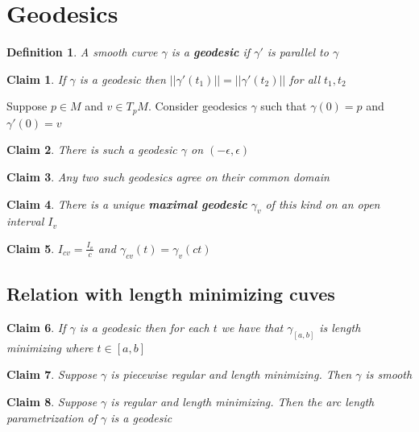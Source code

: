 \documentclass{article}
\newtheorem{definition}{Definition}
\newtheorem{claim}{Claim}
\begin{document}
\section{Geodesics}

\begin{definition}
    A smooth curve $\gamma$ is a \textbf{geodesic} if $\gamma'$ is parallel to $\gamma$
\end{definition}

\begin{claim}
  If $\gamma$ is a geodesic then $||\gamma'(t_1)||=||\gamma'(t_2)||$ for all $t_1,t_2$
\end{claim}

Suppose $p \in M$ and $v \in T_pM$. Consider geodesics $\gamma$ such that $\gamma(0)=p$ and $\gamma'(0)=v$

\begin{claim}
    There is such a geodesic $\gamma$ on $(-\epsilon,\epsilon)$
\end{claim}

\begin{claim}
    Any two such geodesics agree on their common domain
\end{claim}

\begin{claim}
    There is a unique \textbf{maximal geodesic} $\gamma_v$ of this kind on an open interval $I_v$
\end{claim}

\begin{claim}
    $I_{cv}=\frac{I_v}{c}$ and $\gamma_{cv}(t)=\gamma_v(ct)$
\end{claim}

\subsection{Relation with length minimizing cuves}

\begin{claim}
    If $\gamma$ is a geodesic then for each $t$ we have that $\gamma_{[a,b]}$ is length minimizing where $t \in [a,b]$
\end{claim}

\begin{claim}
    Suppose $\gamma$ is piecewise regular and length minimizing. Then $\gamma$ is smooth 
\end{claim}

\begin{claim}
    Suppose $\gamma$ is regular and length minimizing. Then the arc length parametrization of $\gamma$ is a geodesic
\end{claim}
\end{document}
